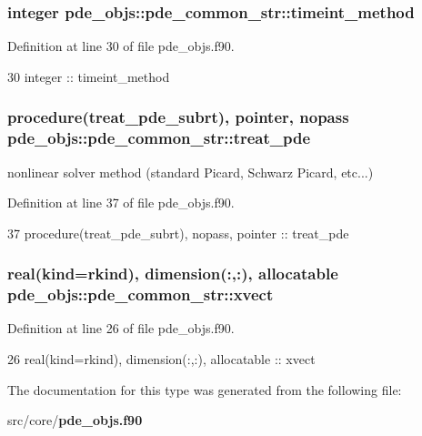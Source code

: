 \subsubsection[{timeint\+\_\+method}]{\setlength{\rightskip}{0pt plus 5cm}integer pde\+\_\+objs\+::pde\+\_\+common\+\_\+str\+::timeint\+\_\+method}\label{structpde__objs_1_1pde__common__str_af3dbf4df5050423b7ccb71354634c3eb}


Definition at line 30 of file pde\+\_\+objs.\+f90.


\begin{DoxyCode}
30     \textcolor{keywordtype}{integer} :: timeint\_method
\end{DoxyCode}
\subsubsection[{treat\+\_\+pde}]{\setlength{\rightskip}{0pt plus 5cm}procedure({\bf treat\+\_\+pde\+\_\+subrt}), pointer, nopass pde\+\_\+objs\+::pde\+\_\+common\+\_\+str\+::treat\+\_\+pde}\label{structpde__objs_1_1pde__common__str_a07a2496e2946d41fa88d9fdc9bbad0c1}


nonlinear solver method (standard Picard, Schwarz Picard, etc...) 



Definition at line 37 of file pde\+\_\+objs.\+f90.


\begin{DoxyCode}
37     \textcolor{keywordtype}{procedure}(treat_pde_subrt), \textcolor{keywordtype}{nopass}, \textcolor{keywordtype}{pointer}       :: treat\_pde
\end{DoxyCode}
\subsubsection[{xvect}]{\setlength{\rightskip}{0pt plus 5cm}real(kind=rkind), dimension(\+:,\+:), allocatable pde\+\_\+objs\+::pde\+\_\+common\+\_\+str\+::xvect}\label{structpde__objs_1_1pde__common__str_a7123fd94a0b378018da9c19ee91a7599}


Definition at line 26 of file pde\+\_\+objs.\+f90.


\begin{DoxyCode}
26     \textcolor{keywordtype}{real(kind=rkind)}, \textcolor{keywordtype}{dimension(:,:)}, \textcolor{keywordtype}{allocatable} :: xvect
\end{DoxyCode}


The documentation for this type was generated from the following file\+:\begin{DoxyCompactItemize}
\item 
src/core/{\bf pde\+\_\+objs.\+f90}\end{DoxyCompactItemize}
